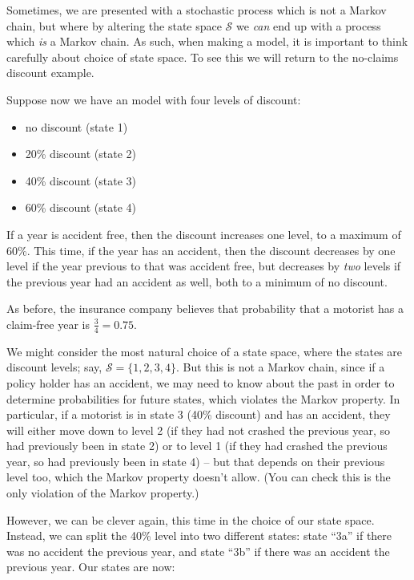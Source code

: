 \documentclass[
  a4paper,
]{article}
\providecommand{\tightlist}{%
  \setlength{\itemsep}{0pt}\setlength{\parskip}{0pt}}
\theoremstyle{definition}
\theoremstyle{definition}
\theoremstyle{definition}
\theoremstyle{remark}
\begin{document}
Sometimes, we are presented with a stochastic process which is not a Markov chain, but where by altering the state space \(\mathcal{S}\) we \emph{can} end up with a process which \emph{is} a Markov chain. As such, when making a model, it is important to think carefully about choice of state space. To see this we will return to the no-claims discount example.

Suppose now we have an model with four levels of discount:

\begin{itemize}
\tightlist
\item
  no discount (state 1)
\item
  20\% discount (state 2)
\item
  40\% discount (state 3)
\item
  60\% discount (state 4)
\end{itemize}

If a year is accident free, then the discount increases one level, to a maximum of 60\%. This time, if the year has an accident, then the discount decreases by one level if the year previous to that was accident free, but decreases by \emph{two} levels if the previous year had an accident as well, both to a minimum of no discount.

As before, the insurance company believes that probability that a motorist has a claim-free year is \(\frac34 = 0.75\).

We might consider the most natural choice of a state space, where the states are discount levels; say, \(\mathcal{S}=\{1,2,3,4\}\). But this is not a Markov chain, since if a policy holder has an accident, we may need to know about the past in order to determine probabilities for future states, which violates the Markov property. In particular, if a motorist is in state 3 (40\% discount) and has an accident, they will either move down to level 2 (if they had not crashed the previous year, so had previously been in state 2) or to level 1 (if they had crashed the previous year, so had previously been in state 4) -- but that depends on their previous level too, which the Markov property doesn't allow. (You can check this is the only violation of the Markov property.)

However, we can be clever again, this time in the choice of our state space. Instead, we can split the 40\% level into two different states: state ``3a'' if there was no accident the previous year, and state ``3b'' if there was an accident the previous year. Our states are now:
\end{document}
